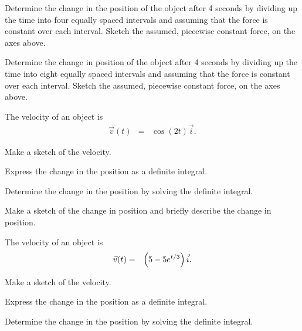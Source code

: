 \begin{problem}
\begin{subproblem}
    \item Determine the change in the position of the object after 4
      seconds by dividing up the time into four equally spaced
      intervals and assuming that the force is constant over each
      interval. Sketch the assumed, piecewise constant force, on the
      axes above.  
      \vfill
    \item Determine the change in position of the object after 4
      seconds by dividing up the time into eight equally spaced
      intervals and assuming that the force is constant over each
      interval. Sketch the assumed, piecewise constant force, on the
      axes above.
      \vfill
  \end{subproblem}
  \clearpage

\end{problem}

\begin{problem}
\item The velocity of an object is 
  \begin{eqnarray*}
    \vec{v}(t) & = & \cos(2t) \vec{i}.
  \end{eqnarray*}
  \begin{subproblem}
  \item Make a sketch of the velocity.  
    \vfill
  \item Express the change in the position as a definite integral.
    \vfill
  \item Determine the change in the position by solving the definite
    integral.
    \vfill
  \item Make a sketch of the change in position and briefly describe
    the change in position.
    \vfill
  \end{subproblem}
  \clearpage

\item The velocity of an object is 
  \begin{eqnarray*}
    \vec{v}(t) & = & \left( 5 - 5 e^{t/3} \right) \vec{i}.
  \end{eqnarray*}
  \begin{subproblem}
  \item Make a sketch of the velocity.  
    \vfill
  \item Express the change in the position as a definite integral.
    \vfill
  \item Determine the change in the position by solving the definite
    integral.
    \vfill
  \end{subproblem}

\end{problem}


